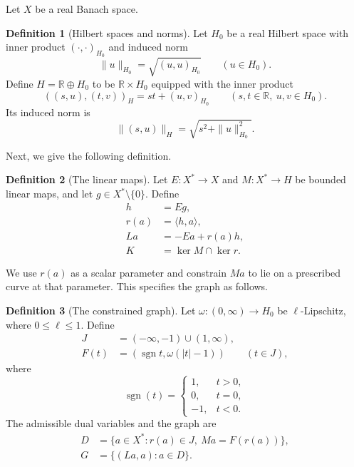 \documentclass[11pt]{article}
\newcommand{\R}{\mathbb R}
\newcommand{\sgn}{\operatorname{sgn}}
\newcommand{\pair}[2]{\langle #1,#2\rangle}
\theoremstyle{definition}
\newtheorem{definition}{Definition}
\theoremstyle{remark}
\begin{document}
Let $X$ be a real Banach space.
\begin{definition}[Hilbert spaces and norms]
\label{def:hilbert-spaces-norms}
Let $H_0$ be a real Hilbert space with inner product $(\cdot,\cdot)_{H_0}$ and induced norm
\[
\|u\|_{H_0}=\sqrt{(u,u)_{H_0}}\qquad(u\in H_0).
\]
Define $H=\R\oplus H_0$ to be $\R\times H_0$ equipped with the inner product
\[
((s,u),(t,v))_H=st+(u,v)_{H_0}
\qquad(s,t\in\R,\ u,v\in H_0).
\]
Its induced norm is
\[
\|(s,u)\|_H=\sqrt{s^2+\|u\|_{H_0}^2}.
\]
\end{definition}
Next, we give the following definition.

\begin{definition}[The linear maps]
\label{def:construction-maps}
Let $E:X^*\to X$ and $M:X^*\to H$ be bounded linear maps, and let $g\in X^*\setminus\{0\}$. Define
\[
\begin{aligned}
h&=Eg,\\
r(a)&=\pair{h}{a},\\
La&=-Ea+r(a)h,\\
K&=\ker M\cap\ker r.
\end{aligned}
\]
\end{definition}

We use $r(a)$ as a scalar parameter and constrain $Ma$ to lie on a prescribed curve at that parameter. This specifies the graph as follows.

\begin{definition}[The constrained graph]
\label{def:construction-graph}
Let $\omega:(0,\infty)\to H_0$ be $\ell$-Lipschitz, where $0\le\ell\le1$. Define
\[
\begin{aligned}
J&=(-\infty,-1)\cup(1,\infty),\\
F(t)&=(\sgn t,\omega(|t|-1))\qquad(t\in J), 
\end{aligned}
\]
where \[
\operatorname{sgn}(t)=
\begin{cases}
1, & t>0,\\
0, & t=0,\\
-1, & t<0.
\end{cases}
\] 
The admissible dual variables and the graph are
\begin{equation}
\begin{aligned}
D&=\{a\in X^*:r(a)\in J,\ Ma=F(r(a))\},\\
G&=\{(La,a):a\in D\}.
\end{aligned}
\label{eq:abs-full-graph}
\end{equation}
\end{definition}
\end{document}
